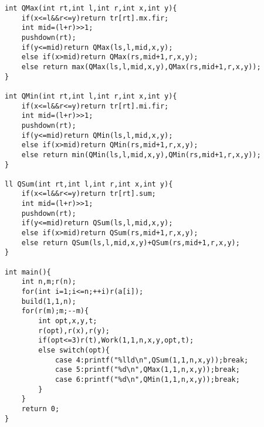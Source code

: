\documentclass{ctexart}
\begin{document}
\begin{lstlisting}
int QMax(int rt,int l,int r,int x,int y){
	if(x<=l&&r<=y)return tr[rt].mx.fir;
	int mid=(l+r)>>1;
	pushdown(rt);
	if(y<=mid)return QMax(ls,l,mid,x,y);
	else if(x>mid)return QMax(rs,mid+1,r,x,y);
	else return max(QMax(ls,l,mid,x,y),QMax(rs,mid+1,r,x,y));
}

int QMin(int rt,int l,int r,int x,int y){
	if(x<=l&&r<=y)return tr[rt].mi.fir;
	int mid=(l+r)>>1;
	pushdown(rt);
	if(y<=mid)return QMin(ls,l,mid,x,y);
	else if(x>mid)return QMin(rs,mid+1,r,x,y);
	else return min(QMin(ls,l,mid,x,y),QMin(rs,mid+1,r,x,y));
}

ll QSum(int rt,int l,int r,int x,int y){
	if(x<=l&&r<=y)return tr[rt].sum;
	int mid=(l+r)>>1;
	pushdown(rt);
	if(y<=mid)return QSum(ls,l,mid,x,y);
	else if(x>mid)return QSum(rs,mid+1,r,x,y);
	else return QSum(ls,l,mid,x,y)+QSum(rs,mid+1,r,x,y);
}

int main(){
	int n,m;r(n);
	for(int i=1;i<=n;++i)r(a[i]);
	build(1,1,n);
	for(r(m);m;--m){
		int opt,x,y,t;
		r(opt),r(x),r(y);
		if(opt<=3)r(t),Work(1,1,n,x,y,opt,t);
		else switch(opt){
			case 4:printf("%lld\n",QSum(1,1,n,x,y));break;
			case 5:printf("%d\n",QMax(1,1,n,x,y));break;
			case 6:printf("%d\n",QMin(1,1,n,x,y));break;
		}
	}
	return 0;
}
\end{lstlisting}
\end{document}
